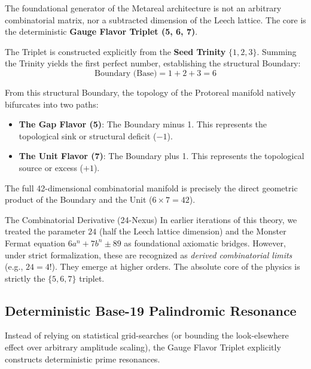 The foundational generator of the Metareal architecture is not an arbitrary combinatorial matrix, nor a subtracted dimension of the Leech lattice. The core is the deterministic \textbf{Gauge Flavor Triplet (5, 6, 7)}. 

The Triplet is constructed explicitly from the \textbf{Seed Trinity} $\{1, 2, 3\}$. Summing the Trinity yields the first perfect number, establishing the structural Boundary:
\begin{equation}
    \text{Boundary (Base)} = 1 + 2 + 3 = 6
\end{equation}

From this structural Boundary, the topology of the Protoreal manifold natively bifurcates into two paths:
\begin{itemize}
    \item \textbf{The Gap Flavor (5)}: The Boundary minus 1. This represents the topological sink or structural deficit ($-1$).
    \item \textbf{The Unit Flavor (7)}: The Boundary plus 1. This represents the topological source or excess ($+1$).
\end{itemize}

The full 42-dimensional combinatorial manifold is precisely the direct geometric product of the Boundary and the Unit ($6 \times 7 = 42$).

\begin{theorembox}{The Combinatorial Derivative (24-Nexus)}
In earlier iterations of this theory, we treated the parameter $24$ (half the Leech lattice dimension) and the Monster Fermat equation $6a^n + 7b^n \pm 89$ as foundational axiomatic bridges. However, under strict formalization, these are recognized as \emph{derived combinatorial limits} (e.g., $24 = 4!$). They emerge at higher orders. The absolute core of the physics is strictly the $\{5, 6, 7\}$ triplet.
\end{theorembox}

\subsection{Deterministic Base-19 Palindromic Resonance}

Instead of relying on statistical grid-searches (or bounding the look-elsewhere effect over arbitrary amplitude scaling), the Gauge Flavor Triplet explicitly constructs deterministic prime resonances.

